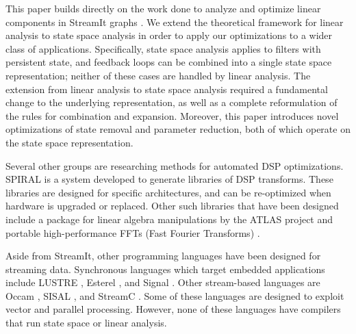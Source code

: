 \label{sec:related}

This paper builds directly on the work done to analyze and optimize
linear components in StreamIt graphs \cite{Lamb}. We extend the
theoretical framework for linear analysis to state space analysis in
order to apply our optimizations to a wider class of applications.
Specifically, state space analysis applies to filters with persistent
state, and feedback loops can be combined into a single state space
representation; neither of these cases are handled by linear analysis.
The extension from linear analysis to state space analysis required a
fundamental change to the underlying representation, as well as a
complete reformulation of the rules for combination and expansion.
Moreover, this paper introduces novel optimizations of state removal
and parameter reduction, both of which operate on the state space
representation.

Several other groups are researching methods for automated DSP
optimizations. SPIRAL \cite{Spiral} is a system developed to generate
libraries of DSP transforms. These libraries are designed for specific
architectures, and can be re-optimized when hardware is upgraded or
replaced. Other such libraries that have been designed include a
package for linear algebra manipulations by the ATLAS project
\cite{Atlas} and portable high-perfor\-mance FFTs (Fast Fourier
Transforms) \cite{fftw}.

Aside from StreamIt, other programming languages have been designed
for streaming data. Synchronous languages which target embedded
applications include LUSTRE \cite{Lustre}, Esterel \cite{Esterel}, and
Signal \cite{Signal}. Other stream-based languages are Occam
\cite{Occam}, SISAL \cite{sisal}, and StreamC \cite{streamc}.  Some of
these languages are designed to exploit vector and parallel
processing. However, none of these languages have compilers that run
state space or linear analysis.
